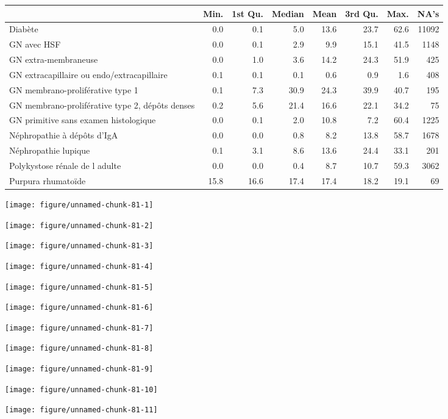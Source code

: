 \documentclass[11pt,a4paper]{article}\usepackage[]{graphicx}\usepackage[]{color}
\makeatletter
\def\maxwidth{ %
  \ifdim\Gin@nat@width>\linewidth
    \linewidth
  \else
    \Gin@nat@width
  \fi
}
\newenvironment{knitrout}{}{} %
\makeatother
\begin{document}
\begin{table}[H]
\centering
\begin{tabular}{lrrrrrrr}
  \hline
 & Min. & 1st Qu. & Median & Mean & 3rd Qu. & Max. & NA's \\ 
  \hline
Diabète & 0.0 & 0.1 & 5.0 & 13.6 & 23.7 & 62.6 & 11092 \\ 
  GN avec HSF & 0.0 & 0.1 & 2.9 & 9.9 & 15.1 & 41.5 & 1148 \\ 
  GN extra-membraneuse & 0.0 & 1.0 & 3.6 & 14.2 & 24.3 & 51.9 & 425 \\ 
  GN extracapillaire ou endo/extracapillaire & 0.1 & 0.1 & 0.1 & 0.6 & 0.9 & 1.6 & 408 \\ 
  GN membrano-proliférative type 1 & 0.1 & 7.3 & 30.9 & 24.3 & 39.9 & 40.7 & 195 \\ 
  GN membrano-proliférative type 2, dépôts denses & 0.2 & 5.6 & 21.4 & 16.6 & 22.1 & 34.2 & 75 \\ 
  GN primitive sans examen histologique & 0.0 & 0.1 & 2.0 & 10.8 & 7.2 & 60.4 & 1225 \\ 
  Néphropathie à dépôts d'IgA & 0.0 & 0.0 & 0.8 & 8.2 & 13.8 & 58.7 & 1678 \\ 
  Néphropathie lupique & 0.1 & 3.1 & 8.6 & 13.6 & 24.4 & 33.1 & 201 \\ 
  Polykystose rénale de l adulte & 0.0 & 0.0 & 0.4 & 8.7 & 10.7 & 59.3 & 3062 \\ 
  Purpura rhumatoïde & 15.8 & 16.6 & 17.4 & 17.4 & 18.2 & 19.1 & 69 \\ 
   \hline
\end{tabular}
\end{table}



\begin{knitrout}
\color{fgcolor}
\texttt{[image: figure/unnamed-chunk-81-1]} 

\texttt{[image: figure/unnamed-chunk-81-2]} 

\texttt{[image: figure/unnamed-chunk-81-3]} 

\texttt{[image: figure/unnamed-chunk-81-4]} 

\texttt{[image: figure/unnamed-chunk-81-5]} 

\texttt{[image: figure/unnamed-chunk-81-6]} 

\texttt{[image: figure/unnamed-chunk-81-7]} 

\texttt{[image: figure/unnamed-chunk-81-8]} 

\texttt{[image: figure/unnamed-chunk-81-9]} 

\texttt{[image: figure/unnamed-chunk-81-10]} 

\texttt{[image: figure/unnamed-chunk-81-11]} 

\end{knitrout}
\end{document}
